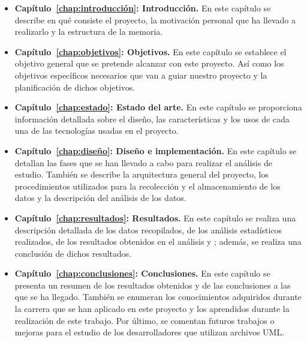 \documentclass[a4paper, 12pt]{book}
\begin{document}
\begin{itemize}
  
  \item \textbf{Capítulo~\ref{chap:introducción}: Introducción.} En este capítulo se describe en qué consiste el proyecto, la motivación personal que ha llevado a realizarlo y la estructura de la memoria. 

  \item \textbf{Capítulo~\ref{chap:objetivos}: Objetivos.} En este capítulo se establece el objetivo general que se pretende alcanzar con este proyecto. 
  Así como los objetivos específicos necesarios que van a guiar nuestro proyecto y la planificación de dichos objetivos. 
  
  \item \textbf{Capítulo~\ref{chap:estado}: Estado del arte.} En este capítulo se proporciona información detallada sobre el diseño, las características y los usos de cada una de las tecnologías usadas en el proyecto.  
  
  \item \textbf{Capítulo~\ref{chap:diseño}: Diseño e implementación.} En este capítulo se detallan las fases que se han llevado a cabo para realizar el análisis de estudio. 
  También se describe la arquitectura general del proyecto, los procedimientos utilizados para la recolección y el almacenamiento de los datos y la descripción del análisis de los datos.

  \item \textbf{Capítulo~\ref{chap:resultados}: Resultados.} En este capítulo se realiza una descripción detallada de los datos recopilados, de los análisis estadísticos realizados, de los resultados obtenidos en el análisis y ; además, se realiza una conclusión de dichos resultados.
 
  \item \textbf{Capítulo~\ref{chap:conclusiones}: Conclusiones.} En este capítulo se presenta un resumen de los resultados obtenidos y de las conclusiones a las que se ha llegado. 
  También se enumeran los conocimientos adquiridos durante la carrera que se han aplicado en este proyecto y los aprendidos durante la realización de este trabajo.
  Por último, se comentan futuros trabajos o mejoras para el estudio de los desarrolladores que utilizan archivos UML. 
  
\end{itemize}


\end{document}
